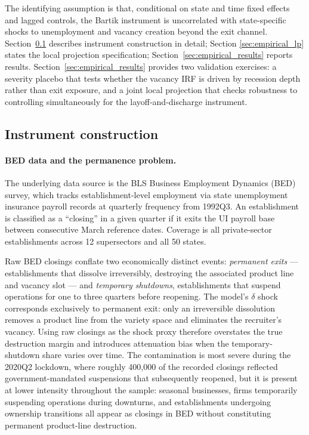 \documentclass[authoryear, review, 12pt]{elsarticle}
\begin{document}
	The identifying assumption is that, conditional on state and time fixed
	effects and lagged controls, the Bartik instrument is uncorrelated with
	state-specific shocks to unemployment and vacancy creation beyond the
	exit channel. Section~\ref{sec:empirical_instr}
	describes instrument construction in detail;
	Section \ref{sec:empirical_lp} states the local projection
	specification; Section~\ref{sec:empirical_results} reports results. Section~\ref{sec:empirical_results} provides two
	validation exercises: a severity placebo that tests whether the vacancy
	IRF is driven by recession depth rather than exit exposure, and a joint
	local projection that checks robustness to controlling simultaneously
	for the layoff-and-discharge instrument.  

	\subsection{Instrument construction}\label{sec:empirical_instr}

	\paragraph{BED data and the permanence problem.}
	The underlying data source is the BLS Business Employment Dynamics
	(BED) survey, which tracks establishment-level employment via state
	unemployment insurance payroll records at quarterly frequency from
	1992Q3.  An establishment is classified as a ``closing'' in a given
	quarter if it exits the UI payroll base between consecutive March
	reference dates.  Coverage is all private-sector establishments across
	12 supersectors and all 50 states.

	Raw BED closings conflate two economically distinct events:
	\emph{permanent exits} --- establishments that dissolve irreversibly,
	destroying the associated product line and vacancy slot --- and
	\emph{temporary shutdowns}, establishments that suspend operations for
	one to three quarters before reopening.  The model's $\delta$ shock
	corresponds exclusively to permanent exit: only an irreversible
	dissolution removes a product line from the variety space and
	eliminates the recruiter's vacancy.  Using raw closings as the shock
	proxy therefore overstates the true destruction margin and introduces
	attenuation bias when the temporary-shutdown share varies over time.
	The contamination is most severe during the 2020Q2 lockdown, where
	roughly 400,000 of the recorded closings reflected government-mandated
	suspensions that subsequently reopened, but it is present at lower
	intensity throughout the sample: seasonal businesses, firms temporarily
	suspending operations during downturns, and establishments undergoing
	ownership transitions all appear as closings in BED without
	constituting permanent product-line destruction.
\end{document}
